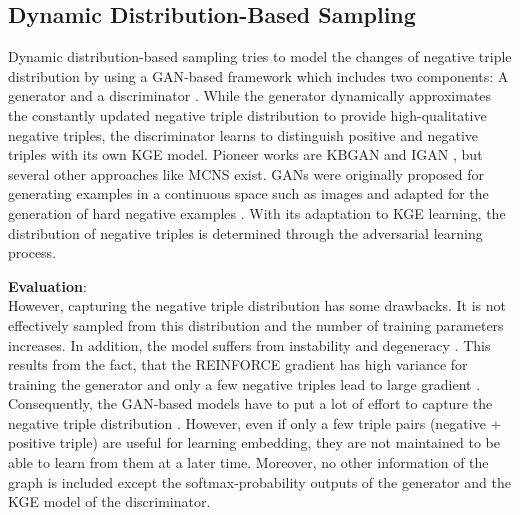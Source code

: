 \subsection{Dynamic Distribution-Based Sampling}
\label{subsec:dynamic_distribution_based_sampling}

Dynamic distribution-based sampling tries to model the changes of negative triple distribution by using a \ac{GAN}-based framework which includes two components: 
A generator and a discriminator \cite{zhang2021efficient}.
While the generator dynamically approximates the constantly updated negative triple distribution to provide high-qualitative negative triples, 
the discriminator learns to distinguish positive and negative triples with its own \ac{KGE} model.
Pioneer works are \ac{KBGAN} \cite{cai2017kbgan} and \ac{IGAN} \cite{IGAN}, but several other approaches like \ac{MCNS} \cite{MCNS} exist.
\acp{GAN} were originally proposed for generating examples in a continuous space such as images and adapted for the generation of hard negative examples \cite{zhang2021efficient}.
With its adaptation to \ac{KGE} learning, the distribution of negative triples is determined through the adversarial learning process.  

\textbf{Evaluation}:\\
However, capturing the negative triple distribution has some drawbacks.
It is not effectively sampled from this distribution and the number of training parameters increases.
In addition, the model suffers from instability and degeneracy \cite{zhang2021efficient}.
This results from the fact, that the \textsc{REINFORCE} gradient has high variance for training the generator and only a few negative triples lead to large gradient \cite{zhang2021efficient}.
Consequently, the \ac{GAN}-based models have to put a lot of  effort to capture the negative triple distribution \cite{zhang2021efficient}.
However, even if only a few triple pairs (negative + positive triple) are useful for learning embedding, they are not maintained to be able to learn from them at a later time.
Moreover, no other information of the graph is included except the softmax-probability outputs of the generator and the \ac{KGE} model of the discriminator.